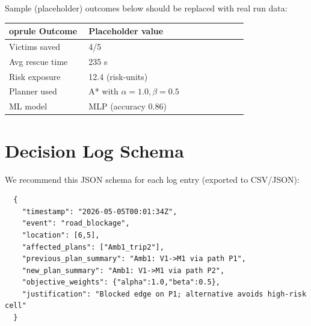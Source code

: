 \documentclass[conference]{IEEEtran}
\begin{document}

  Sample (placeholder) outcomes below should be replaced with real run data:
  \begin{longtable}{p{0.32\linewidth}p{0.64\linewidth}}
  	oprule
  Outcome & Placeholder value \\\midrule
  Victims saved & 4/5 \\
  Avg rescue time & 235 s \\
  Risk exposure & 12.4 (risk-units) \\
  Planner used & A* with $\alpha=1.0,\beta=0.5$ \\
  ML model & MLP (accuracy 0.86) \\
  \bottomrule
  \end{longtable}

  \section{Decision Log Schema}
  We recommend this JSON schema for each log entry (exported to CSV/JSON):
  \begin{lstlisting}
  {
    "timestamp": "2026-05-05T00:01:34Z",
    "event": "road_blockage",
    "location": [6,5],
    "affected_plans": ["Amb1_trip2"],
    "previous_plan_summary": "Amb1: V1->M1 via path P1",
    "new_plan_summary": "Amb1: V1->M1 via path P2",
    "objective_weights": {"alpha":1.0,"beta":0.5},
    "justification": "Blocked edge on P1; alternative avoids high-risk cell"
  }
  \end{lstlisting}


\end{document}
\end{itemize}
\end{document}
